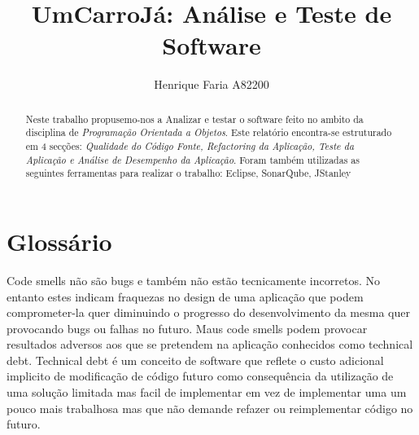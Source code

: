 

\title{UmCarroJá: Análise e Teste de Software}

\author{Henrique Faria A82200}




\maketitle

\begin{abstract}
Neste trabalho propusemo-nos a Analizar e testar o software feito no ambito da disciplina de \textit{Programação Orientada a Objetos}.\newline
Este relatório encontra-se estruturado em 4 secções: \textit{Qualidade do Código Fonte, Refactoring da Aplicação, Teste da Aplicação e Análise de Desempenho da Aplicação}.\newline
Foram também utilizadas as seguintes ferramentas para realizar o trabalho:\newline
Eclipse, SonarQube, JStanley
\end{abstract}

\section{Glossário}

Code smells não são bugs e também não estão tecnicamente incorretos. No entanto estes indicam fraquezas no design de uma aplicação que podem comprometer-la quer diminuindo o progresso do desenvolvimento da mesma quer provocando bugs ou falhas no futuro. Maus code smells podem provocar resultados adversos aos que se pretendem na aplicação conhecidos como technical debt.\newline
Technical debt é um conceito de software que reflete o custo adicional implicito de modificação de código futuro como consequência da utilização de uma solução limitada mas facil de implementar em vez de implementar uma um pouco mais trabalhosa mas que não demande refazer ou reimplementar código no futuro.


